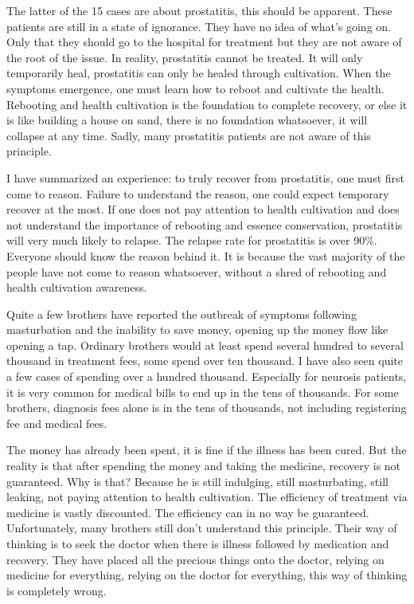 \documentclass[
]{book}
\begin{document}
The latter of the 15 cases are about prostatitis, this should be apparent. These patients are still in a state of ignorance. They have no idea of what's going on. Only that they should go to the hospital for treatment but they are not aware of the root of the issue. In reality, prostatitis cannot be treated. It will only temporarily heal, prostatitis can only be healed through cultivation. When the symptoms emergence, one must learn how to reboot and cultivate the health. Rebooting and health cultivation is the foundation to complete recovery, or else it is like building a house on sand, there is no foundation whatsoever, it will collapse at any time. Sadly, many prostatitis patients are not aware of this principle.

I have summarized an experience: to truly recover from prostatitis, one must first come to reason. Failure to understand the reason, one could expect temporary recover at the most. If one does not pay attention to health cultivation and does not understand the importance of rebooting and essence conservation, prostatitis will very much likely to relapse. The relapse rate for prostatitis is over 90\%. Everyone should know the reason behind it. It is because the vast majority of the people have not come to reason whatsoever, without a shred of rebooting and health cultivation awareness.

Quite a few brothers have reported the outbreak of symptoms following masturbation and the inability to save money, opening up the money flow like opening a tap. Ordinary brothers would at least spend several hundred to several thousand in treatment fees, some spend over ten thousand. I have also seen quite a few cases of spending over a hundred thousand. Especially for neurosis patients, it is very common for medical bills to end up in the tens of thousands. For some brothers, diagnosis fees alone is in the tens of thousands, not including registering fee and medical fees.

The money has already been spent, it is fine if the illness has been cured. But the reality is that after spending the money and taking the medicine, recovery is not guaranteed. Why is that? Because he is still indulging, still masturbating, still leaking, not paying attention to health cultivation. The efficiency of treatment via medicine is vastly discounted. The efficiency can in no way be guaranteed. Unfortunately, many brothers still don't understand this principle. Their way of thinking is to seek the doctor when there is illness followed by medication and recovery. They have placed all the precious things onto the doctor, relying on medicine for everything, relying on the doctor for everything, this way of thinking is completely wrong.
\end{document}
